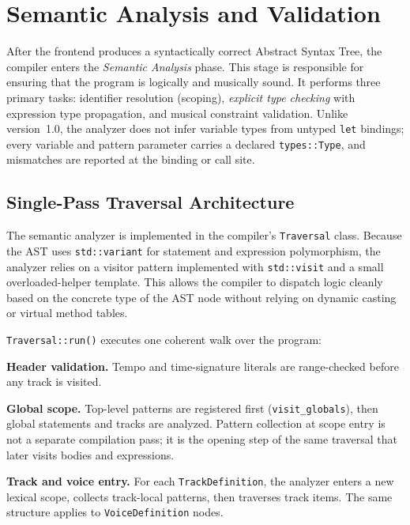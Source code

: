 \section{Semantic Analysis and Validation}\label{sec:semantic-rules}

After the frontend produces a syntactically correct Abstract Syntax Tree, the compiler enters the \textit{Semantic
Analysis} phase.
This stage is responsible for ensuring that the program is logically and musically sound.
It performs three primary tasks: identifier resolution (scoping), \textit{explicit type checking} with expression
type propagation, and musical constraint validation.
Unlike version~1.0, the analyzer does not infer variable types from untyped \texttt{let} bindings; every variable and
pattern parameter carries a declared \texttt{types::Type}, and mismatches are reported at the binding or call site.

\subsection{Single-Pass Traversal Architecture}\label{detail-subsec:single-pass-traversal}

The semantic analyzer is implemented in the compiler's \texttt{Traversal} class.
Because the AST uses \texttt{std::variant} for statement and expression polymorphism, the analyzer relies on a visitor
pattern implemented with \texttt{std::visit} and a small overloaded-helper template.
This allows the compiler to dispatch logic cleanly based on the concrete type of the AST node without relying on dynamic
casting or virtual method tables.

\texttt{Traversal::run()} executes one coherent walk over the program:

\noindent \textbf{Header validation.} Tempo and time-signature literals are range-checked before any track is visited.

\noindent \textbf{Global scope.} Top-level patterns are registered first (\texttt{visit\_globals}), then global
statements and tracks are analyzed.
Pattern collection at scope entry is not a separate compilation pass; it is the opening step of the same traversal
that later visits bodies and expressions.

\noindent \textbf{Track and voice entry.} For each \texttt{TrackDefinition}, the analyzer enters a new lexical scope,
collects track-local patterns, then traverses track items.
The same structure applies to \texttt{VoiceDefinition} nodes.

